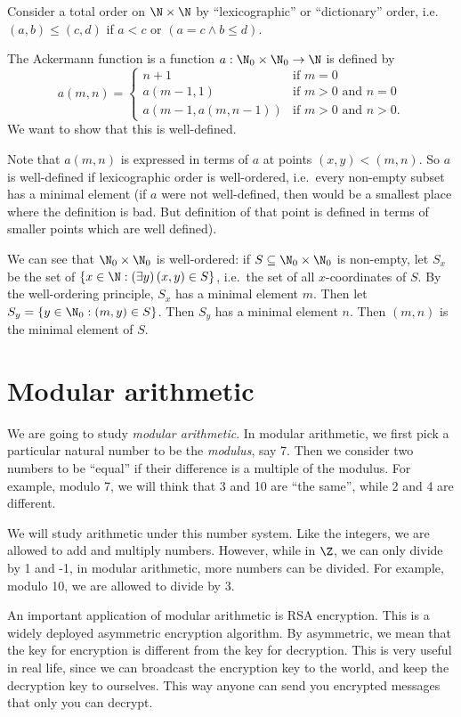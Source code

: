 \documentclass[a4paper]{article}
\begin{document}
\begin{eg}
  Consider a total order on $\N\times \N$ by ``lexicographic'' or ``dictionary'' order, i.e.\ $(a, b) \leq (c, d)$ if $a < c$ or $(a = c\wedge b\leq d)$.

  The Ackermann function is a function $a:\N_0\times \N_0 \to \N$ is defined by
  \[
    a(m, n) =\begin{cases}n+1 & \mbox{if } m = 0 \\a(m-1, 1) & \mbox{if } m > 0 \mbox{ and } n = 0 \\a(m-1, a(m, n-1)) & \mbox{if } m > 0 \mbox{ and } n > 0.\end{cases}
  \]
  We want to show that this is well-defined.

  Note that $a(m, n)$ is expressed in terms of $a$ at points $(x, y) < (m, n)$. So $a$ is well-defined if lexicographic order is well-ordered, i.e.\ every non-empty subset has a minimal element (if $a$ were not well-defined, then would be a smallest place where the definition is bad. But definition of that point is defined in terms of smaller points which are well defined).

  We can see that $\N_0\times \N_0$ is well-ordered: if $S\subseteq \N_0\times \N_0$ is non-empty, let $S_x$ be the set of $\{x\in \N: (\exists y)\,(x, y)\in S\}$, i.e.\ the set of all $x$-coordinates of $S$. By the well-ordering principle, $S_x$ has a minimal element $m$. Then let $S_y = \{y\in \N_0: (m, y)\in S\}$. Then $S_y$ has a minimal element $n$. Then $(m, n)$ is the minimal element of $S$.
\end{eg}

\section{Modular arithmetic}
We are going to study \emph{modular arithmetic}. In modular arithmetic, we first pick a particular natural number to be the \emph{modulus}, say 7. Then we consider two numbers to be ``equal'' if their difference is a multiple of the modulus. For example, modulo 7, we will think that 3 and 10 are ``the same'', while 2 and 4 are different.

We will study arithmetic under this number system. Like the integers, we are allowed to add and multiply numbers. However, while in $\Z$, we can only divide by 1 and -1, in modular arithmetic, more numbers can be divided. For example, modulo 10, we are allowed to divide by 3.

An important application of modular arithmetic is RSA encryption. This is a widely deployed asymmetric encryption algorithm. By asymmetric, we mean that the key for encryption is different from the key for decryption. This is very useful in real life, since we can broadcast the encryption key to the world, and keep the decryption key to ourselves. This way anyone can send you encrypted messages that only you can decrypt.
\end{document}
